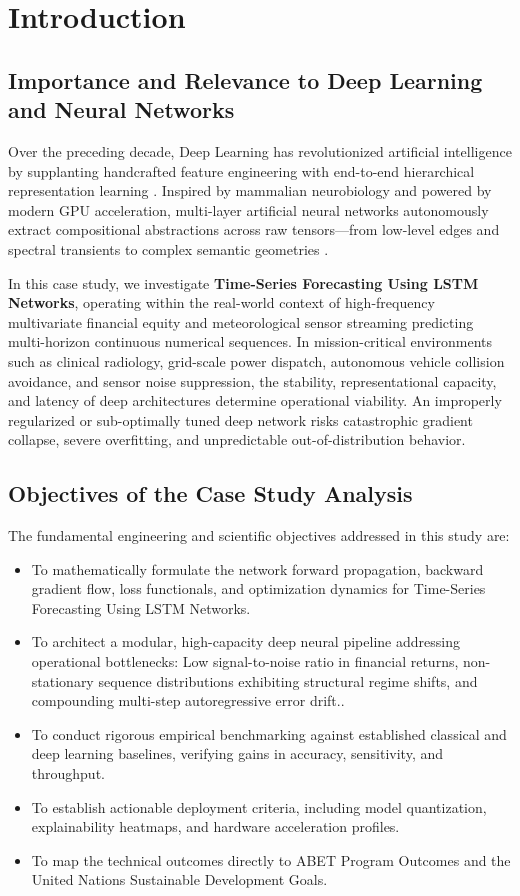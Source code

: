 \section{Introduction}

\subsection{Importance and Relevance to Deep Learning and Neural Networks}
Over the preceding decade, Deep Learning has revolutionized artificial intelligence by supplanting handcrafted feature engineering with end-to-end hierarchical representation learning \cite{lecun2015deep}. Inspired by mammalian neurobiology and powered by modern GPU acceleration, multi-layer artificial neural networks autonomously extract compositional abstractions across raw tensors---from low-level edges and spectral transients to complex semantic geometries \cite{goodfellow2016deep}.

In this case study, we investigate \textbf{Time-Series Forecasting Using LSTM Networks}, operating within the real-world context of high-frequency multivariate financial equity and meteorological sensor streaming predicting multi-horizon continuous numerical sequences. In mission-critical environments such as clinical radiology, grid-scale power dispatch, autonomous vehicle collision avoidance, and sensor noise suppression, the stability, representational capacity, and latency of deep architectures determine operational viability. An improperly regularized or sub-optimally tuned deep network risks catastrophic gradient collapse, severe overfitting, and unpredictable out-of-distribution behavior.

\subsection{Objectives of the Case Study Analysis}
The fundamental engineering and scientific objectives addressed in this study are:
\begin{itemize}
  \item To mathematically formulate the network forward propagation, backward gradient flow, loss functionals, and optimization dynamics for Time-Series Forecasting Using LSTM Networks.
  \item To architect a modular, high-capacity deep neural pipeline addressing operational bottlenecks: Low signal-to-noise ratio in financial returns, non-stationary sequence distributions exhibiting structural regime shifts, and compounding multi-step autoregressive error drift..
  \item To conduct rigorous empirical benchmarking against established classical and deep learning baselines, verifying gains in accuracy, sensitivity, and throughput.
  \item To establish actionable deployment criteria, including model quantization, explainability heatmaps, and hardware acceleration profiles.
  \item To map the technical outcomes directly to ABET Program Outcomes and the United Nations Sustainable Development Goals.
\end{itemize}
